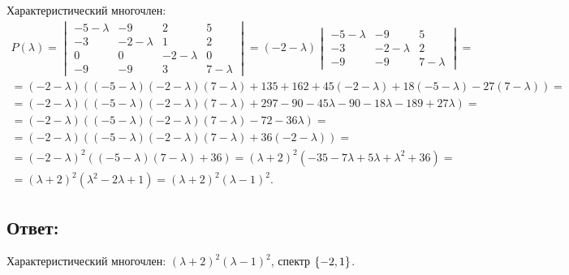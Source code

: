 \documentclass[12pt]{article}
\begin{document}
    Характеристический многочлен:
    \begin{multline*}
        P(\lambda)
        = \begin{vmatrix}
              -5 - \lambda & -9 & 2 & 5 \\
              -3 & -2 - \lambda & 1 & 2 \\
              0 & 0 & -2 - \lambda & 0 \\
              -9 & -9 & 3 & 7 - \lambda
        \end{vmatrix}
        = ( -2 - \lambda)
        \begin{vmatrix}
            -5 - \lambda & -9 & 5 \\
            -3 & -2 - \lambda & 2 \\
            -9 & -9 & 7 - \lambda
        \end{vmatrix} = \\
        = (-2 - \lambda) ( (-5 - \lambda)(-2 - \lambda)(7 - \lambda) + 135 + 162 + 45(-2 - \lambda) + 18 (-5 - \lambda) - 27(7 - \lambda) ) = \\
        = (-2 - \lambda) ( (-5 - \lambda)(-2 - \lambda)(7 - \lambda) + 297 - 90 - 45 \lambda - 90 - 18 \lambda - 189 + 27 \lambda ) = \\
        = (-2 - \lambda) ( (-5 - \lambda)(-2 - \lambda)(7 - \lambda) - 72 - 36 \lambda ) = \\
        = (-2 - \lambda) ( (-5 - \lambda)(-2 - \lambda)(7 - \lambda) + 36 (- 2 - \lambda ) ) = \\
        = (-2 - \lambda)^2 ( (-5 - \lambda)(7 - \lambda) + 36 )
        = (\lambda + 2)^2 (-35 - 7 \lambda + 5 \lambda + \lambda^2 + 36) = \\
        = (\lambda + 2)^2 (\lambda^2 - 2 \lambda + 1)
        = (\lambda + 2)^2 (\lambda - 1)^2 .
    \end{multline*}

    \subsection*{Ответ:}
    Характеристический многочлен: $(\lambda + 2)^2 (\lambda - 1)^2$, спектр $\left \{ -2, 1 \right \}$.
\end{document}
